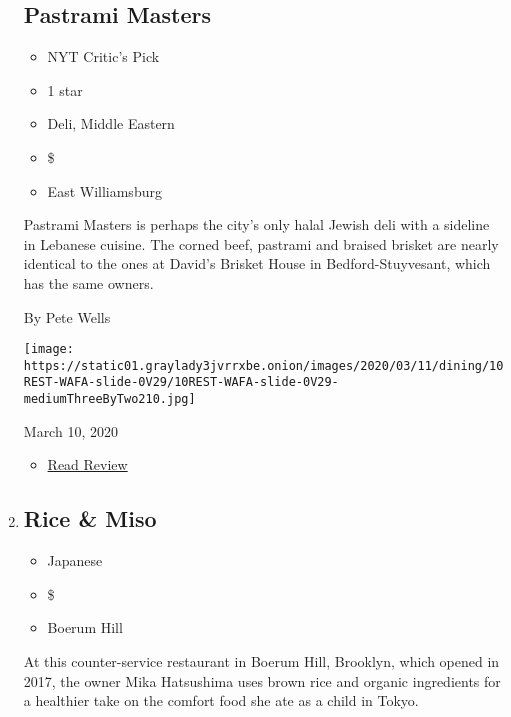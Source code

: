 \begin{enumerate}
  \hypertarget{pastrami-masters}{%
  \subsection{Pastrami Masters}\label{pastrami-masters}}

  \begin{itemize}
  \tightlist
  \item
    NYT Critic's Pick
  \item
     1 star
  \item
    Deli, Middle Eastern
  \item
    \$
  \item
    East Williamsburg
  \end{itemize}

  Pastrami Masters is perhaps the city's only halal Jewish deli with a
  sideline in Lebanese cuisine. The corned beef, pastrami and braised
  brisket are nearly identical to the ones at David's Brisket House in
  Bedford-Stuyvesant, which has the same owners.

  By Pete Wells

  \texttt{[image: https://static01.graylady3jvrrxbe.onion/images/2020/03/11/dining/10REST-WAFA-slide-0V29/10REST-WAFA-slide-0V29-mediumThreeByTwo210.jpg]}

  March 10, 2020

  \begin{itemize}
  \tightlist
  \item
    \href{https://www.nytimes3xbfgragh.onion/2020/03/10/dining/pastrami-masters-review-pete-wells.html?rref=collection\%2Fcollection\%2Frestaurant-guide}{Read
    Review}
  \end{itemize}
\item
  \href{https://www.nytimes3xbfgragh.onion/2020/03/05/dining/rice-and-miso-review-onigiri.html}{}

  \hypertarget{rice--miso}{%
  \subsection{Rice \& Miso}\label{rice--miso}}

  \begin{itemize}
  \tightlist
  \item
    Japanese
  \item
    \$
  \item
    Boerum Hill
  \end{itemize}

  At this counter-service restaurant in Boerum Hill, Brooklyn, which
  opened in 2017, the owner Mika Hatsushima uses brown rice and organic
  ingredients for a healthier take on the comfort food she ate as a
  child in Tokyo.


\end{enumerate}
